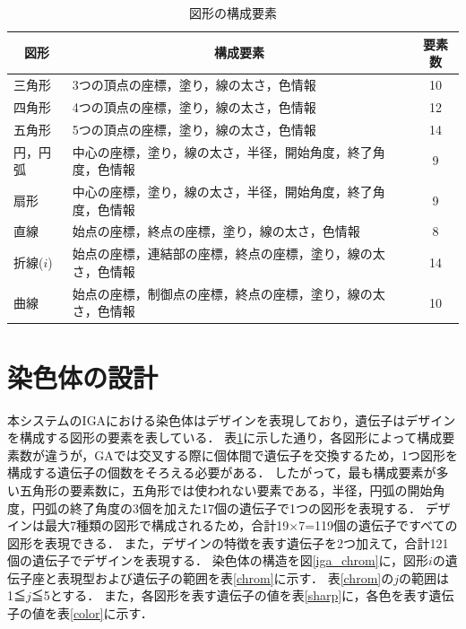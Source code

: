 \begin{table}[htbp]
	\centering
	\caption{図形の構成要素}
	\begin{tabular}{|l|l|c|} \hline
    \multicolumn{1}{|c|}{図形} & \multicolumn{1}{|c|}{構成要素} & \multicolumn{1}{|c|}{要素数}\\ \hline
	三角形& 3つの頂点の座標，塗り，線の太さ，色情報　& 10\\ \hline
    四角形& 4つの頂点の座標，塗り，線の太さ，色情報　& 12\\ \hline
    五角形& 5つの頂点の座標，塗り，線の太さ，色情報　& 14\\ \hline
    円，円弧&中心の座標，塗り，線の太さ，半径，開始角度，終了角度，色情報 & 9 \\ \hline 
    扇形& 中心の座標，塗り，線の太さ，半径，開始角度，終了角度，色情報 & 9 \\ \hline 
    直線 & 始点の座標，終点の座標，塗り，線の太さ，色情報&8\\ \hline
    折線($i$)& 始点の座標，連結部の座標，終点の座標，塗り，線の太さ，色情報 & 14\\ \hline
    曲線& 始点の座標，制御点の座標，終点の座標，塗り，線の太さ，色情報　& 10\\ \hline
	\end{tabular}
	\label{sharp_need}
\end{table}


\section{染色体の設計}
本システムのIGAにおける染色体はデザインを表現しており，遺伝子はデザインを構成する図形の要素を表している．
表\ref{sharp_need}に示した通り，各図形によって構成要素数が違うが，GAでは交叉する際に個体間で遺伝子を交換するため，1つ図形を構成する遺伝子の個数をそろえる必要がある．
したがって，最も構成要素が多い五角形の要素数に，五角形では使われない要素である，半径，円弧の開始角度，円弧の終了角度の3個を加えた17個の遺伝子で1つの図形を表現する．
デザインは最大7種類の図形で構成されるため，合計19×7=119個の遺伝子ですべての図形を表現できる．
また，デザインの特徴を表す遺伝子を2つ加えて，合計121個の遺伝子でデザインを表現する．
染色体の構造を図\ref{iga_chrom}に，図形$i$の遺伝子座と表現型および遺伝子の範囲を表\ref{chrom}に示す．
表\ref{chrom}の$j$の範囲は1≦$j$≦5とする．
また，各図形を表す遺伝子の値を表\ref{sharp}に，各色を表す遺伝子の値を表\ref{color}に示す．

